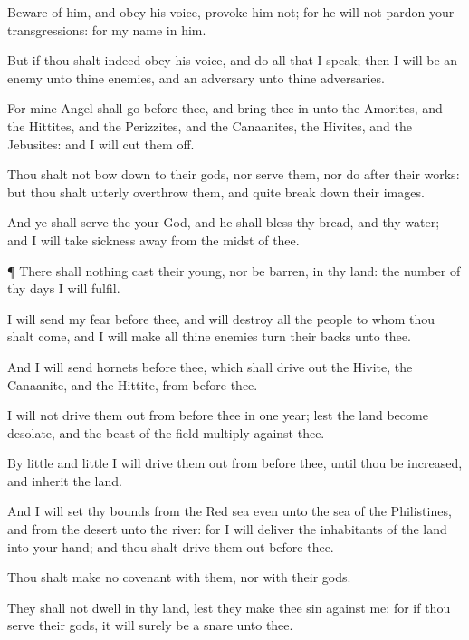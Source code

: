 {Beware
of him, and
obey his
voice,
provoke him not; for he will not
pardon your
transgressions: for my
name
{} in
him.

But if thou shalt
indeed
obey his
voice, and
do all that I
speak; then I will be an
enemy unto thine
enemies, and an
adversary unto thine
adversaries.

For mine
Angel shall
go
before thee, and
bring thee in unto the
Amorites, and the
Hittites, and the
Perizzites, and the
Canaanites, the
Hivites, and the
Jebusites: and I will cut them
off.

Thou shalt not bow
down to their
gods, nor
serve them, nor
do after their
works: but thou shalt
utterly
overthrow them, and
quite break
down their
images.

And ye shall
serve the
{} your
God, and he shall
bless thy
bread, and thy
water; and I will
take
sickness
away from the
midst of thee.


\par }{\PP {}¶ There shall nothing cast their
young, nor be
barren, in thy
land: the
number of thy
days I will
fulfil.

I will
send my
fear
before thee, and will
destroy all the
people to whom thou shalt
come, and I will
make all thine
enemies turn their
backs unto thee.

And I will
send
hornets
before thee, which shall drive
out the
Hivite, the
Canaanite, and the
Hittite, from
before thee.

I will not drive them
out from
before thee in
one
year; lest the
land become
desolate, and the
beast of the
field
multiply against thee.

By
little and
little I will drive them
out from
before thee, until thou be
increased, and
inherit the
land.

And I will
set thy
bounds from the
Red
sea even unto the
sea of the
Philistines, and from the
desert unto the
river: for I will
deliver the
inhabitants of the
land into your
hand; and thou shalt drive them
out
before thee.

Thou shalt
make no
covenant with them, nor with their
gods.

They shall not
dwell in thy
land, lest they make thee
sin against me: for if thou
serve their
gods, it will surely be a
snare unto thee.




}
